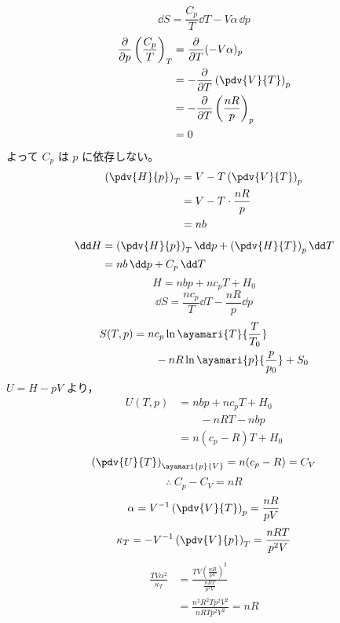 \[ \dd S=\frac{C_{p}}{T}\dd T-V\alpha\,\dd p \]
\begin{align*}
\frac{\partial}{\partial p}\left(\frac{C_{p}}{T}\right)_{T}&=\frac{\partial}{\partial T}(-V\alpha)_{p}\\
&=-\frac{\partial}{\partial T}\left(\pdv{V}{T}\right)_{p}\\
&=-\frac{\partial}{\partial T}\left(\frac{nR}{p}\right)_{p}\\
&=0
\end{align*}
よって $C_{p}$ は $p$ に依存しない。
\begin{align*}
\left(\pdv{H}{p}\right)_{T}&=V-T\left(\pdv{V}{T}\right)_{p}\\
&=V-T\cdot\frac{nR}{p}\\
&=nb
\end{align*}
\begin{align*}
\dd H&=\left(\pdv{H}{p}\right)_{T}\dd p+\left(\pdv{H}{T}\right)_{p}\dd T\\
&=nb\,\dd p+C_{p}\,\dd T
\end{align*}
\[ H=nbp+nc_{p}T+H_{0} \]
\[ \dd S=\frac{nc_{p}}{T}\dd T-\frac{nR}{p}\dd p \]
\begin{align*}
S(T,p)&=nc_{p}\ln\ayamari{T}{\frac{T}{T_{0}}}\\
&\qquad-nR\ln\ayamari{p}{\frac{p}{p_{0}}}+S_{0}
\end{align*}
$U=H-pV$ より，
\begin{align*}
U(T,p)&=nbp+nc_{p}T+H_{0}\\
&\qquad-nRT-nbp\\
&=n(c_{p}-R)T+H_{0}
\end{align*}
\[ \left(\pdv{U}{T}\right)_{\ayamari{p}{V}}=n(c_{p}-R)=C_{V} \]
\[ \therefore\ C_{p}-C_{V}=nR \]
\[ \alpha=V^{-1}\left(\pdv{V}{T}\right)_{p}=\frac{nR}{pV} \]
\[ \kappa_{T}=-V^{-1}\left(\pdv{V}{p}\right)_{T}=\frac{nRT}{p^{2}V} \]
\begin{align*}
\frac{TV\alpha^{2}}{\kappa_{T}}&=\frac{TV\left(\frac{nR}{pV}\right)^{2}}{\frac{nRT}{p^{2}V}}\\
&=\frac{n^{2}R^{2}Tp^{2}V^{2}}{nRTp^{2}V^{2}}=nR
\end{align*}
